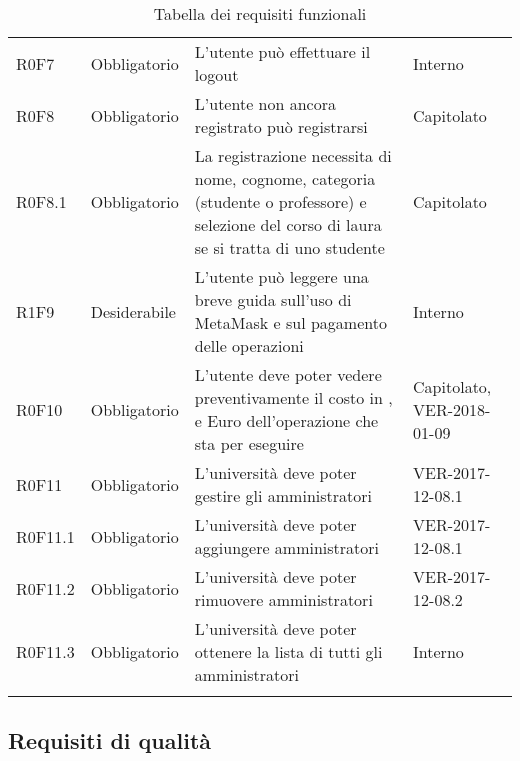 \documentclass[AnalisiDeiRequisiti.tex]{subfiles}
\begin{document}
\begin{longtable}[H]{p{2.6cm}p{2.5cm}p{5cm}p{2cm}}
	R0F7 & Obbligatorio & L'utente può effettuare il logout & Interno \\  
	R0F8 & Obbligatorio & L'utente non ancora registrato può registrarsi & Capitolato \\  
	R0F8.1 & Obbligatorio & La registrazione necessita di nome, cognome, categoria (studente o professore) e selezione del corso di laura se si tratta di uno studente & Capitolato \\  
	R1F9 & Desiderabile & L'utente può leggere una breve guida sull'uso di MetaMask e sul pagamento delle operazioni & Interno \\  	
	R0F10 & Obbligatorio & L'utente deve poter vedere preventivamente il costo in \citGloss{Gas}, \citGloss{Ether} e Euro dell'operazione che sta per eseguire & Capitolato, VER-2018-01-09 \\  	
	R0F11 & Obbligatorio & L'università deve poter gestire gli amministratori & VER-2017-12-08.1 \\
	R0F11.1 & Obbligatorio & L'università deve poter aggiungere amministratori & VER-2017-12-08.1 \\
	R0F11.2 & Obbligatorio & L'università deve poter rimuovere amministratori & VER-2017-12-08.2 \\
	R0F11.3 & Obbligatorio & L'università deve poter ottenere la lista di tutti gli amministratori & Interno \\
	\hiderowcolors
	\caption{Tabella dei requisiti funzionali}
\end{longtable}

\subsection{Requisiti di qualità}
\end{document}

